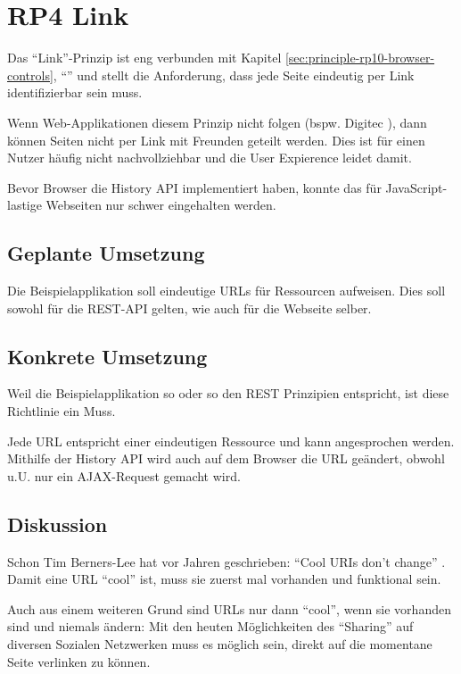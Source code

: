 \section{RP4 Link}
\label{sec:principle-rp4-link}

Das ``Link''-Prinzip ist eng verbunden mit Kapitel \ref{sec:principle-rp10-browser-controls}, ``'' und stellt die Anforderung, dass jede Seite eindeutig per Link identifizierbar sein muss.

Wenn Web-Applikationen diesem Prinzip nicht folgen (bspw. Digitec \cite{Digitec}), dann können Seiten nicht per Link mit Freunden geteilt werden.
Dies ist für einen Nutzer häufig nicht nachvollziehbar und die User Expierence leidet damit.

Bevor Browser die History API \cite{HistoryAPI} implementiert haben, konnte das für JavaScript-lastige Webseiten nur schwer eingehalten werden.

\subsection*{Geplante Umsetzung}
Die Beispielapplikation soll eindeutige URLs für Ressourcen aufweisen. Dies soll sowohl für die REST-API gelten, wie auch für die Webseite selber.

\subsection*{Konkrete Umsetzung}
Weil die Beispielapplikation so oder so den REST \cite{REST} Prinzipien entspricht, ist diese Richtlinie ein Muss.

Jede URL entspricht einer eindeutigen Ressource und kann angesprochen werden.
Mithilfe der History API \cite{HistoryAPI} wird auch auf dem Browser die URL
geändert, obwohl u.U. nur ein AJAX-Request gemacht wird.

\subsection*{Diskussion}
Schon Tim Berners-Lee hat vor Jahren geschrieben: ``Cool URIs don't change'' \cite{CoolURIsTBL}.
Damit eine URL ``cool'' ist, muss sie zuerst mal vorhanden und funktional sein.

Auch aus einem weiteren Grund sind URLs nur dann ``cool'', wenn sie vorhanden sind
und niemals ändern: Mit den heuten Möglichkeiten des ``Sharing'' auf diversen Sozialen
Netzwerken muss es möglich sein, direkt auf die momentane Seite verlinken zu können.
